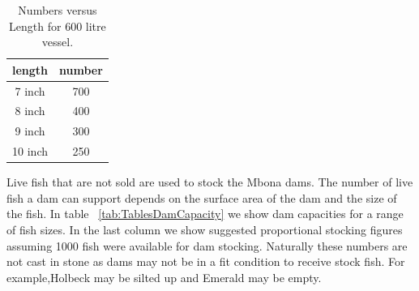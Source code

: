     \begin{table}[h]
  \centering
  \begin{tabular}{|c|c|}
    \hline
    length & number   \\ \hline
    7 inch & 700  \\ \hline
     8 inch & 400  \\ \hline
      9 inch & 300  \\ \hline
       10 inch & 250  \\ \hline
  \end{tabular} 
  \caption{Numbers versus Length for 600 litre vessel.}
  \label{tab:TransportationNumbers}
\end{table}

Live fish that are not sold are used to stock the Mbona dams. The number of live fish a dam can support
depends on the surface area of the dam and the size of the fish. In table ~\ref{tab:TablesDamCapacity} we
show dam capacities for a range of fish sizes. In the last column we show suggested proportional stocking
figures assuming 1000 fish were available for dam stocking. Naturally these numbers are not cast in stone
as dams may not be in a fit condition to receive stock fish. For example,Holbeck may be silted up and
Emerald may be empty.

